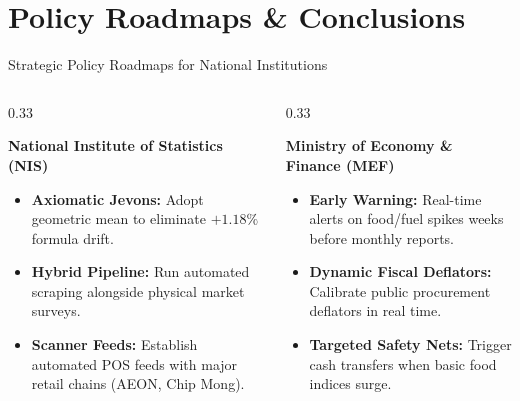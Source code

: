 \documentclass[aspectratio=169, 10pt]{beamer}
\begin{document}
\section{Policy Roadmaps \& Conclusions}

\begin{frame}{Strategic Policy Roadmaps for National Institutions}
  \begin{columns}
    \begin{column}{0.33\textwidth}
      \begin{block}{\centering \textbf{National Institute of Statistics (NIS)}}
        \small
        \begin{itemize}
          \item \textbf{Axiomatic Jevons:} Adopt geometric mean to eliminate $+1.18\%$ formula drift.
          \item \textbf{Hybrid Pipeline:} Run automated scraping alongside physical market surveys.
          \item \textbf{Scanner Feeds:} Establish automated POS feeds with major retail chains (AEON, Chip Mong).
        \end{itemize}
      \end{block}
    \end{column}

    \begin{column}{0.33\textwidth}
      \begin{exampleblock}{\centering \textbf{Ministry of Economy \& Finance (MEF)}}
        \small
        \begin{itemize}
          \item \textbf{Early Warning:} Real-time alerts on food/fuel spikes weeks before monthly reports.
          \item \textbf{Dynamic Fiscal Deflators:} Calibrate public procurement deflators in real time.
          \item \textbf{Targeted Safety Nets:} Trigger cash transfers when basic food indices surge.
        \end{itemize}
      \end{exampleblock}
    \end{column}


\end{columns}
\end{frame}
\end{document}
